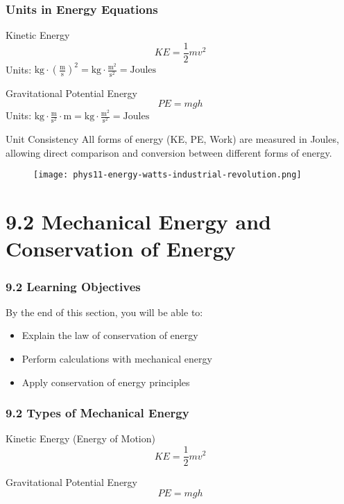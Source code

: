 \documentclass{beamer}
\begin{document}
\begin{frame}
\frametitle{Units in Energy Equations}
\begin{block}{Kinetic Energy}
$$KE = \frac{1}{2}mv^2$$
Units: $\text{kg} \cdot (\frac{\text{m}}{\text{s}})^2 = \text{kg}\cdot\frac{\text{m}^2}{\text{s}^2} = \text{Joules}$
\end{block}

\begin{block}{Gravitational Potential Energy}
$$PE = mgh$$
Units: $\text{kg} \cdot \frac{\text{m}}{\text{s}^2} \cdot \text{m} = \text{kg}\cdot\frac{\text{m}^2}{\text{s}^2} = \text{Joules}$
\end{block}

\begin{exampleblock}{Unit Consistency}
All forms of energy (KE, PE, Work) are measured in Joules, allowing direct comparison and conversion between different forms of energy.
\end{exampleblock}
\end{frame}

\begin{frame}
\begin{figure}
    \centering
    \texttt{[image: phys11-energy-watts-industrial-revolution.png]}
\end{figure}
\end{frame}

\section{9.2 Mechanical Energy and Conservation of Energy}

\begin{frame}
\frametitle{9.2 Learning Objectives}
By the end of this section, you will be able to:
\begin{itemize}
\item Explain the law of conservation of energy
\item Perform calculations with mechanical energy
\item Apply conservation of energy principles
\end{itemize}
\end{frame}

\begin{frame}
\frametitle{9.2 Types of Mechanical Energy}
\begin{block}{Kinetic Energy (Energy of Motion)}
$$KE = \frac{1}{2}mv^2$$
\end{block}

\begin{block}{Gravitational Potential Energy}
$$PE = mgh$$
\end{block}
\end{frame}
\end{document}
